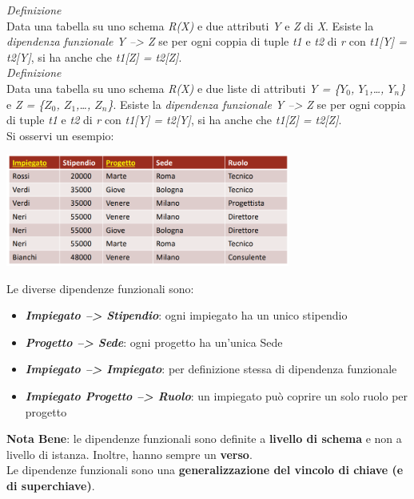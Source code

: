 \documentclass{article}
\begin{document}
\textit{Definizione}\\
Data una tabella su uno schema \textit{R(X)} e due attributi \textit{Y} e \textit{Z} di \textit{X}. Esiste la \textit{dipendenza funzionale Y --> Z} se per ogni coppia di tuple \textit{t1} e \textit{t2} di \textit{r} con \textit{t1[Y] = t2[Y]}, si ha anche che \textit{t1[Z] = t2[Z]}.\vspace{14pt}\\
\textit{Definizione}\\
Data una tabella su uno schema \textit{R(X)} e due liste di attributi \textit{Y = \{$Y_0$, $Y_1$,\dots, $Y_n$\}} e \textit{Z = \{$Z_0$, $Z_1$,\dots, $Z_n$\}}. Esiste la \textit{dipendenza funzionale Y --> Z} se per ogni coppia di tuple \textit{t1} e \textit{t2} di \textit{r} con \textit{t1[Y] = t2[Y]}, si ha anche che \textit{t1[Z] = t2[Z]}.\vspace{14pt}\\
Si osservi un esempio:
\begin{center}
    \includegraphics[width=0.7\textwidth]{foto2.png}
\end{center}
Le diverse dipendenze funzionali sono:
\begin{itemize}[label={-}, leftmargin=1cm]
    \itemsep0em
    \item \textbf{\textit{Impiegato --> Stipendio}}: ogni impiegato ha un unico stipendio
    \item \textbf{\textit{Progetto --> Sede}}: ogni progetto ha un'unica Sede
    \item \textbf{\textit{Impiegato --> Impiegato}}: per definizione stessa di dipendenza funzionale
    \item \textbf{\textit{Impiegato Progetto --> Ruolo}}: un impiegato può coprire un solo ruolo per progetto
\end{itemize}
\textbf{Nota Bene}: le dipendenze funzionali sono definite a \textbf{livello di schema} e non a livello di istanza. Inoltre, hanno sempre un \textbf{verso}.\vspace{14pt}\\
Le dipendenze funzionali sono una \textbf{generalizzazione del vincolo di chiave (e di superchiave)}.\vspace{14pt}\\
\end{document}

